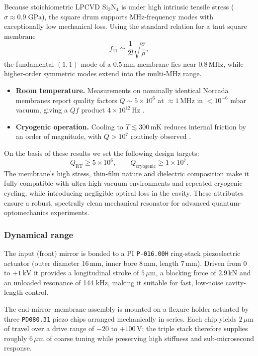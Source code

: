 Because stoichiometric LPCVD Si$_3$N$_4$ is under high intrinsic tensile
stress ($\sigma\!\approx\!0.9\;\mathrm{GPa}$), the square drum supports
MHz-frequency modes with exceptionally low mechanical loss\cite{SiN_review}.
Using the standard relation for a taut square membrane
\[
  f_{11} \simeq \frac{1}{2l}\sqrt{\frac{\sigma}{\rho}},
\]
the fundamental $(1,1)$ mode of a $0.5\,\mathrm{mm}$ membrane
lies near $0.8\,\mathrm{MHz}$, while higher-order symmetric modes extend
into the multi-MHz range.

\begin{itemize}
  \item \textbf{Room temperature.}  Measurements on nominally identical
        Norcada membranes report quality factors
        $Q \sim 5\times10^{6}$ at $\approx1\,\mathrm{MHz}$ in
        $<10^{-6}$ mbar vacuum, giving a
        $Qf$ product $ 4\times10^{12}\,\mathrm{Hz}$ \cite{SiN_review,Norcada_datasheet}.
  \item \textbf{Cryogenic operation.}  Cooling to $T \lesssim 300\,\mathrm{mK}$
        reduces internal friction by an order of magnitude, with
        $Q>10^{7}$ routinely observed \cite{SiN_cryogenic}.
\end{itemize}

On the basis of these results we set the following design targets:
\[
  Q_{\mathrm{RT}} \ge 5\times10^{6}, \qquad
  Q_{\mathrm{cryogenic}} \ge 1\times10^{7}.
\]
The membrane’s high stress, thin-film nature and dielectric composition make
it fully compatible with ultra-high-vacuum environments and repeated
cryogenic cycling, while introducing negligible optical loss in the cavity.
These attributes ensure a robust, spectrally clean mechanical resonator for
advanced quantum-optomechanics experiments.


\subsubsection{Dynamical range}

The input (front) mirror is bonded to a PI \texttt{P-016.00H} ring-stack piezoelectric actuator (outer diameter 16\,mm, inner bore 8\,mm, length 7\,mm). Driven from 0 to $+1\,\mathrm{kV}$ it provides a longitudinal stroke of $5\,\mu\text{m}$, a blocking force of $2.9\,\mathrm{kN}$ and an unloaded resonance of 144 kHz, making it suitable for fast, low-noise cavity-length control.

The end-mirror–membrane assembly is mounted on a flexure holder actuated by three \texttt{PD080.31} piezo chips arranged mechanically in series. Each chip yields $2\,\mu\text{m}$ of travel over a drive range of $-20$ to $+100\,\mathrm{V}$; the triple stack therefore supplies roughly $6\,\mu\text{m}$ of coarse tuning while preserving high stiffness and sub-microsecond response.


